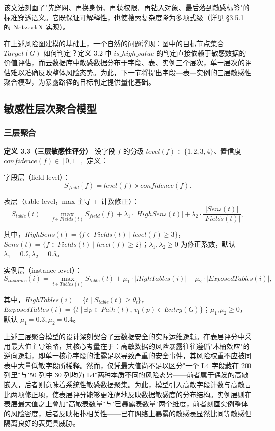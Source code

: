 \documentclass[a4paper,12pt]{ctexart}
\begin{document}
该文法刻画了"先穿网、再换身份、再获权限、再钻入对象、最后落到敏感标签"的标准穿透语义。它既保证可解释性，也使搜索复杂度降为多项式级（详见 §3.5.1 的 NetworkX 实现）。

在上述风险图建模的基础上，一个自然的问题浮现：图中的目标节点集合 $Target(G)$ 如何判定？定义 3.2 中 $is\_high\_value$ 的判定直接依赖于敏感数据的价值评估，而云数据库中敏感数据分布于字段、表、实例三个层次，单一层次的评估难以准确反映整体风险态势。为此，下一节将提出字段—表—实例的三层敏感性聚合模型，为暴露路径的目标判定提供量化基础。

\subsection{敏感性层次聚合模型}

\subsubsection{三层聚合}

\textbf{定义 3.3（三层敏感性评分）} 设字段 $f$ 的分级 $level(f) \in \{1,2,3,4\}$、置信度 $confidence(f) \in [0,1]$，定义：

字段层（field-level）：
\[S_{field}(f) = level(f) \times confidence(f).\]

表层（table-level，max 主导 + 计数修正）：
\[S_{table}(t) = \max_{f \in Fields(t)} S_{field}(f) + \lambda_1 \cdot |HighSens(t)| + \lambda_2 \cdot \frac{|Sens(t)|}{|Fields(t)|},\]

其中，$HighSens(t) = \{f \in Fields(t) \mid level(f) \ge 3\}$，$Sens(t) = \{f \in Fields(t) \mid level(f) \ge 2\}$；$\lambda_1, \lambda_2 \ge 0$ 为修正系数，默认 $\lambda_1 = 0.2, \lambda_2 = 0.5$。

实例层（instance-level）：
\[S_{instance}(i) = \max_{t \in Tables(i)} S_{table}(t) + \mu_1 \cdot |HighTables(i)| + \mu_2 \cdot |ExposedTables(i)|,\]

其中，$HighTables(i) = \{t \mid S_{table}(t) \ge \theta_t\}$，$ExposedTables(i) = \{t \mid \exists\,p\in Path(t),\, v_1(p)\in Entry(G)\}$；$\mu_1, \mu_2 \ge 0$，默认 $\mu_1 = 0.3, \mu_2 = 0.4$。

上述三层聚合模型的设计深刻契合了云数据安全的实际运维逻辑。在表层评分中采用最大值主导策略，其核心考量在于：高敏数据的风险暴露往往遵循"木桶效应"的逆向逻辑，即单一核心字段的泄露足以导致严重的安全事件，其风险权重不应被同表中大量低敏字段所稀释。然而，仅凭最大值尚不足以区分"一个 L4 字段藏在 200 列里"与"50 列中 30 列均为 L4"两种本质不同的风险态势——前者属于偶发的高敏嵌入，后者则意味着系统性敏感数据聚集。为此，模型引入高敏字段计数与高敏占比两项修正项，使表层评分能够更准确地反映数据敏感度的分布结构。实例层则在表层最大值之上叠加"高敏表数量"与"已暴露表数量"两个维度，前者刻画实例整体的风险密度，后者反映拓扑相关性——已在网络上暴露的敏感表显然比同等敏感但隔离良好的表更具威胁。
\end{document}
